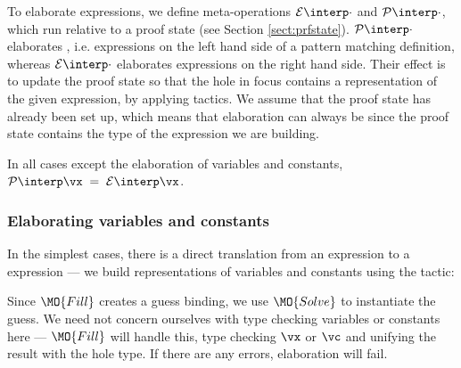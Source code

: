 

To elaborate expressions, we define meta-operations $\ttinterp{\cdot}$ and
$\ttpinterp{\cdot}$, which run relative to a proof state (see Section
\ref{sect:prfstate}). $\ttpinterp{\cdot}$ elaborates , i.e.
expressions on the left hand side of a pattern matching definition, whereas
$\ttinterp{\cdot}$ elaborates expressions on the right hand side.
Their effect is
to update the proof state so that the hole in focus contains a representation
of the given expression, by applying tactics. We assume that the proof state
has already been set up, which means that elaboration can always be
 since the proof state contains the type of the expression we
are building.

In all cases except the elaboration of variables and constants, 
$\ttpinterp{\vx}\;=\;\ttinterp{\vx}$.

\subsubsection{Elaborating variables and constants}

In the simplest cases, there is a direct translation from an \IdrisM{} expression to
a \TT{} expression --- we build \TT{} representations of variables and constants using
the  tactic:


Since $\MO{Fill}$ creates a guess binding, we use $\MO{Solve}$ to instantiate
the guess.  We need not concern ourselves with type checking variables or
constants here --- $\MO{Fill}$ will handle this, type checking $\vx$ or $\vc$
and unifying the result with the hole type. If there are any errors,
elaboration will fail.

